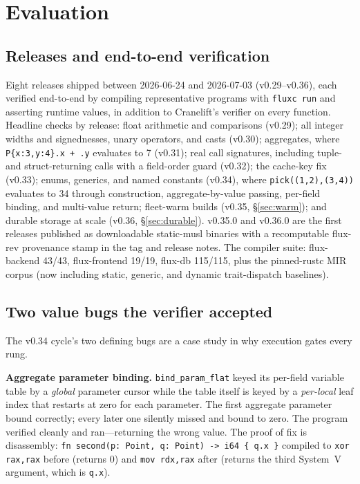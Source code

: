 \section{Evaluation}

\subsection{Releases and end-to-end verification}

Eight releases shipped between 2026-06-24 and 2026-07-03 (v0.29--v0.36), each verified end-to-end by compiling representative programs with \texttt{fluxc run} and asserting runtime values, in addition to Cranelift's verifier on every function. Headline checks by release: float arithmetic and comparisons (v0.29); all integer widths and signednesses, unary operators, and casts (v0.30); aggregates, where \texttt{P\{x:3,y:4\}.x + .y} evaluates to 7 (v0.31); real call signatures, including tuple- and struct-returning calls with a field-order guard (v0.32); the cache-key fix (v0.33); enums, generics, and named constants (v0.34), where \texttt{pick((1,2),(3,4))} evaluates to 34 through construction, aggregate-by-value passing, per-field binding, and multi-value return; fleet-warm builds (v0.35, \S\ref{sec:warm}); and durable storage at scale (v0.36, \S\ref{sec:durable}). v0.35.0 and v0.36.0 are the first releases published as downloadable static-musl binaries with a recomputable flux-rev provenance stamp in the tag and release notes. The compiler suite: flux-backend 43/43, flux-frontend 19/19, flux-db 115/115, plus the pinned-rustc MIR corpus (now including static, generic, and dynamic trait-dispatch baselines).

\subsection{Two value bugs the verifier accepted}

The v0.34 cycle's two defining bugs are a case study in why execution gates every rung.

\textbf{Aggregate parameter binding.} \texttt{bind\_param\_flat} keyed its per-field variable table by a \emph{global} parameter cursor while the table itself is keyed by a \emph{per-local} leaf index that restarts at zero for each parameter. The first aggregate parameter bound correctly; every later one silently missed and bound to zero. The program verified cleanly and ran---returning the wrong value. The proof of fix is disassembly: \texttt{fn second(p: Point, q: Point) -> i64 \{ q.x \}} compiled to \texttt{xor rax,rax} before (returns 0) and \texttt{mov rdx,rax} after (returns the third System~V argument, which is \texttt{q.x}).

